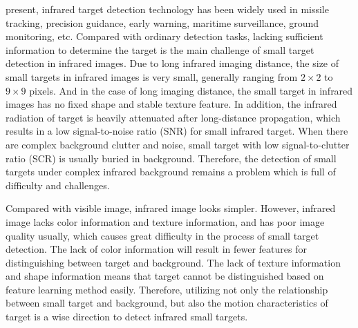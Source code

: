 \documentclass[journal]{IEEEtran}
\begin{document}
 present, infrared target detection technology has been widely used in missile tracking, precision guidance, early warning, maritime surveillance, ground monitoring\cite{luo2015space,dawson2010space,li2014infrared}, etc. Compared with ordinary detection tasks, lacking sufficient information to determine the target is the main challenge of small target detection in infrared images. Due to long infrared imaging distance, the size of small targets in infrared images is very small, generally ranging from $2\times2$ to $9\times9$ pixels\cite{wang2017infrared}. And in the case of long imaging distance, the small target in infrared images has no fixed shape and stable texture feature. In addition, the infrared radiation of target is heavily attenuated after long-distance propagation, which results in a low signal-to-noise ratio (SNR) for small infrared target\cite{li2016novel}. When there are complex background clutter and noise, small target with low signal-to-clutter ratio (SCR) is usually buried in background. Therefore, the detection of small targets under complex infrared background remains a problem which is full of difficulty and challenges.

Compared with visible image, infrared image looks simpler. However, infrared image lacks color information and texture information, and has poor image quality usually, which causes great difficulty in the process of small target detection. The lack of color information will result in fewer features for distinguishing between target and background. The lack of texture information and shape information means that target cannot be distinguished based on feature learning method easily. Therefore, utilizing not only the relationship between small target and background, but also the motion characteristics of target is a wise direction to detect infrared small targets.
\end{document}
